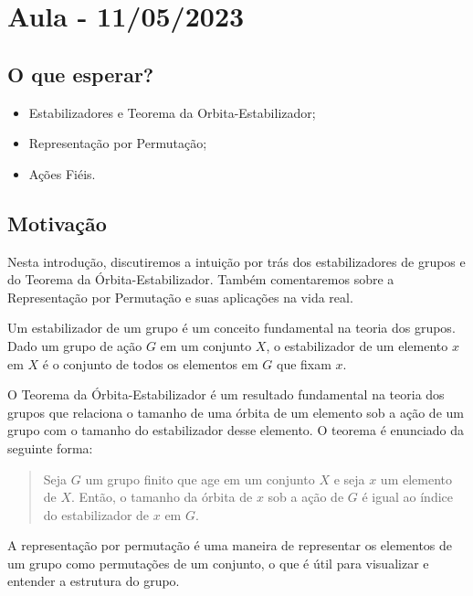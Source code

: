 \documentclass{article}
\begin{document}
\section{Aula - 11/05/2023}
\subsection{O que esperar?}
\begin{itemize}
  \item Estabilizadores e Teorema da Orbita-Estabilizador;
  \item Representa\c cão por Permuta\c cão;
  \item A\c cões Fiéis.
\end{itemize}
\subsection{Motiva\c cão}
  Nesta introdu\c cão, discutiremos a intuição por trás dos estabilizadores de grupos e do Teorema da Órbita-Estabilizador. Também comentaremos sobre a
  Representação por Permutação e suas aplicações na vida real.

  Um estabilizador de um grupo é um conceito fundamental na teoria dos grupos. Dado um grupo de ação $G$ em um conjunto $X$, o estabilizador de um elemento
  $x$ em $X$ é o conjunto de todos os elementos em $G$ que fixam $x$.

  O Teorema da Órbita-Estabilizador é um resultado fundamental na teoria dos grupos que relaciona o tamanho de uma órbita de um elemento sob a ação de um grupo
  com o tamanho do estabilizador desse elemento. O teorema é enunciado da seguinte forma:
 \begin{quote}
   Seja $G$ um grupo finito que age em um conjunto $X$ e seja $x$ um elemento de $X$. Então, o tamanho da órbita de $x$ sob a ação de $G$ é igual ao
   índice do estabilizador de $x$ em $G$.
 \end{quote}

  A representação por permutação é uma maneira de representar os elementos de um grupo como permutações de um conjunto, o que é útil para visualizar e entender
  a estrutura do grupo.
\end{document}
